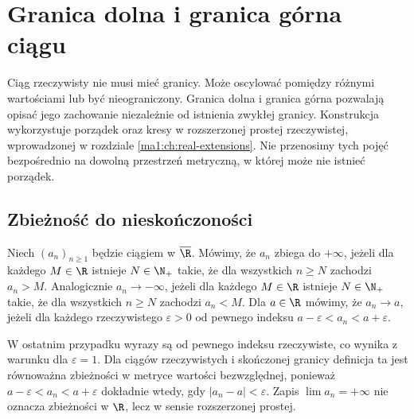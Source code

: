 \chapter{Granica dolna i granica górna ciągu}
\label{ma1:ch:liminf-limsup}

Ciąg rzeczywisty nie musi mieć granicy. Może oscylować pomiędzy różnymi wartościami lub być nieograniczony. Granica dolna i granica górna pozwalają opisać jego zachowanie niezależnie od istnienia zwykłej granicy. Konstrukcja wykorzystuje porządek oraz kresy w rozszerzonej prostej rzeczywistej, wprowadzonej w rozdziale \ref{ma1:ch:real-extensions}. Nie przenosimy tych pojęć bezpośrednio na dowolną przestrzeń metryczną, w której może nie istnieć porządek.

\section{Zbieżność do nieskończoności}
\begin{definicja}
\label{ma1:def:extended-sequence-limit}
Niech $(a_n)_{n\ge1}$ będzie ciągiem w $\overline{\R}$. Mówimy, że $a_n$ zbiega do $+\infty$, jeżeli dla każdego $M\in\R$ istnieje $N\in\N_+$ takie, że dla wszystkich $n\ge N$ zachodzi $a_n>M$. Analogicznie $a_n\to-\infty$, jeżeli dla każdego $M\in\R$ istnieje $N\in\N_+$ takie, że dla wszystkich $n\ge N$ zachodzi $a_n<M$. Dla $a\in\R$ mówimy, że $a_n\to a$, jeżeli dla każdego rzeczywistego $\varepsilon>0$ od pewnego indeksu $a-\varepsilon<a_n<a+\varepsilon$.
\end{definicja}
W ostatnim przypadku wyrazy są od pewnego indeksu rzeczywiste, co wynika z warunku dla $\varepsilon=1$. Dla ciągów rzeczywistych i skończonej granicy definicja ta jest równoważna zbieżności w metryce wartości bezwzględnej, ponieważ $a-\varepsilon<a_n<a+\varepsilon$ dokładnie wtedy, gdy $|a_n-a|<\varepsilon$. Zapis $\lim a_n=+\infty$ nie oznacza zbieżności w $\R$, lecz w sensie rozszerzonej prostej.

